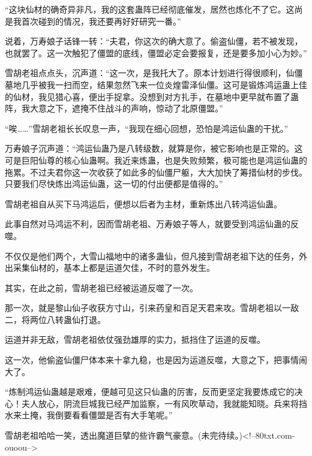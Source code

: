 \begin{this_body}
“这块仙材的确奇异非凡，我的这套蛊阵已经彻底催发，居然也炼化不了它。这尚是我首次碰到的情况，我还要再好好研究一番。”

说着，万寿娘子话锋一转：“夫君，你这次的确大意了。偷盗仙僵，若不被发现，也就罢了。这一次触犯了僵盟的底线，僵盟必定会要报复，还是要多加小心为妙。”

雪胡老祖点点头，沉声道：“这一次，是我托大了。原本计划进行得很顺利，仙僵墓地几乎被我一扫而空，结果忽然飞来一位炎煌雷泽仙僵。这可是锻炼鸿运蛊上佳的仙材，我见猎心喜，便出手捉拿。没想到对方扎手，在墓地中更早就布置了蛊阵，我大意之下，遮掩不住战斗的声响，惊动了北原僵盟。”

“唉……”雪胡老祖长长叹息一声，“我现在细心回想，恐怕是鸿运仙蛊的干扰。”

万寿娘子沉声道：“鸿运仙蛊乃是八转级数，就算是你，被它影响也是正常的。这可是巨阳仙尊的核心仙蛊啊。我近来炼蛊，也是失败频繁，极可能也是鸿运仙蛊的拖累。不过夫君你这一次收获了如此多的仙僵尸躯，大大加快了筹措仙材的步伐。只要我们尽快炼出鸿运仙蛊，这一切的付出便都是值得的。”

雪胡老祖自从买下马鸿运后，便想以后者为主材，重新炼出八转鸿运仙蛊。

此事自然对马鸿运不利，因而雪胡老祖、万寿娘子等人，就要受到鸿运仙蛊的反噬。

不仅仅是他们两个，大雪山福地中的诸多蛊仙，但凡接到雪胡老祖下达的任务，外出采集仙材的，基本上都是运道欠佳，不时的意外发生。

其实，在此之前，雪胡老祖已经被运道反噬了一次。

那一次，就是黎山仙子收获方寸山，引来药皇和百足天君来攻。雪胡老祖以一敌二，将两位八转蛊仙打退。

运道并非无敌，雪胡老祖依仗强劲雄厚的实力，抵挡住了运道的反噬。

这一次，他偷盗仙僵尸体本来十拿九稳，也是因为运道反噬，大意之下，把事情闹大了。

“炼制鸿运仙蛊越是艰难，便越可见这只仙蛊的厉害，反而更坚定我要炼成它的决心！夫人放心，阴流巨城我已经严加监察，一有风吹草动，我就能知晓。兵来将挡水来土掩，我倒要看看僵盟是否有大手笔呢。”

雪胡老祖哈哈一笑，透出魔道巨擘的些许霸气豪意。(未完待续。)<!--80txt.com-ouoou-->

\end{this_body}

